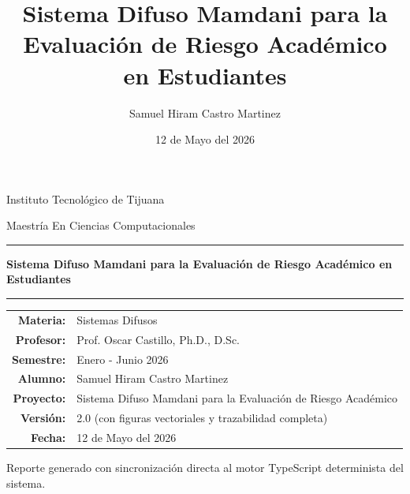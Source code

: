 \documentclass[12pt,letterpaper]{article}
\title{Sistema Difuso Mamdani para la Evaluación de Riesgo Académico en Estudiantes}
\author{Samuel Hiram Castro Martinez}
\date{12 de Mayo del 2026}
\begin{document}
\begin{titlepage}
  \centering
  {\Large Instituto Tecnológico de Tijuana\par}
  \vspace{0.4cm}
  {\large Maestría En Ciencias Computacionales\par}
  \vspace{1.6cm}
  {\color{difTeal}\rule{0.7\linewidth}{1pt}\par}
  \vspace{0.8cm}
  {\LARGE\bfseries Sistema Difuso Mamdani para la Evaluación de Riesgo Académico en Estudiantes\par}
  \vspace{0.4cm}
  {\color{difTeal}\rule{0.7\linewidth}{1pt}\par}
  \vspace{1.6cm}
  \begin{tabularx}{0.92\textwidth}{>{\bfseries}r X}
    Materia: & Sistemas Difusos\\
    Profesor: & Prof. Oscar Castillo, Ph.D., D.Sc.\\
    Semestre: & Enero - Junio 2026\\
    Alumno: & Samuel Hiram Castro Martinez\\
    Proyecto: & Sistema Difuso Mamdani para la Evaluación de Riesgo Académico\\
    Versión: & 2.0 (con figuras vectoriales y trazabilidad completa)\\
    Fecha: & 12 de Mayo del 2026
  \end{tabularx}
  \vfill
  \small\color{difMuted} Reporte generado con sincronización directa al motor TypeScript determinista del sistema.\par
\end{titlepage}



\tableofcontents
\listoffigures
\listoftables
\newpage











\appendix






\end{document}

